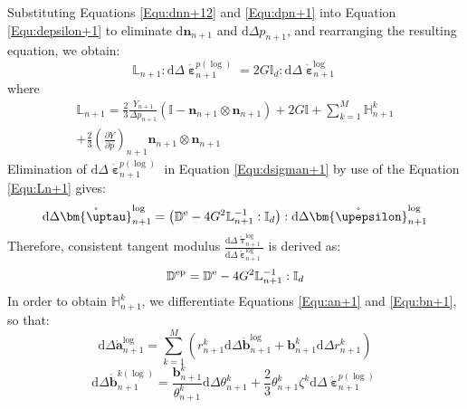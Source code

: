 Substituting Equations \ref{Equ:dnn+12} and \ref{Equ:dpn+1} into Equation \ref{Equ:depsilon+1} to eliminate ${\text{d}}{{\mathbf{n}}_{n + 1}}$ and ${\text{d}}\Delta {p_{n + 1}}$, and rearranging the resulting equation, we obtain:
\begin{equation}
{\mathbb{L}_{n + 1}}:{\text{d}}\Delta \mathring {\bm{\upepsilon}}_{n + 1}^{p(\log) } = 2G{\mathbb{I}_d}:{\text{d}}\Delta \mathring {\bm{\upepsilon}}_{n + 1}^{\log }
\end{equation}
where
\begin{equation}
\label{Equ:Ln+1}
\begin{aligned}
\mathbb{L}_{n + 1} = \frac{2}{3}\frac{Y_{n + 1}}{\Delta {p_{n + 1}}} \left( \mathbb{I} - \mathbf{n}_{n + 1} \otimes \mathbf{n}_{n + 1} \right) + 2G\mathbb{I} + \sum \limits_{k = 1}^M {\mathbb{H}_{n + 1}^k} \\
   + \frac{2}{3}{{\left( {\frac{{\partial Y}}{{\partial p}}} \right)}_{n + 1}}{{\mathbf{n}}_{n + 1}} \otimes {{\mathbf{n}}_{n + 1}}
\end{aligned}
\end{equation}
Elimination of ${\text{d}}\Delta \mathring {\bm{\upepsilon}}_{n + 1}^{p(\log) }$ in Equation \ref{Equ:dsigman+1} by use of the Equation \ref{Equ:Ln+1} gives:
\begin{equation}
{\text{d}}\Delta \mathring {\bm{\uptau}}_{n + 1}^{\log } = \left( {{\mathbb{D}^{\rm{e}}} - 4{G^2}\mathbb{L}_{n + 1}^{ - 1}:{\mathbb{I}_d}} \right):{\text{d}}\Delta \mathring {\bm{\upepsilon}}_{n + 1}^{\log }
\end{equation}
Therefore, consistent tangent modulus $\frac{{\text{d}}\Delta \mathring {\bm{\uptau}}_{n + 1}^{\log }}{{\text{d}}\Delta \mathring {\bm{\upepsilon}}_{n + 1}^{\log }}$ is derived as:
\begin{equation}
{\mathbb{D}^{\rm{ep}}} = {\mathbb{D}^{\rm{e}}} - 4{G^2}\mathbb{L}_{n + 1}^{ - 1}:{\mathbb{I}_d}
\end{equation}
In order to obtain $\mathbb{H}_{n + 1}^k$, we differentiate Equations \ref{Equ:an+1} and \ref{Equ:bn+1}, so that:
\begin{equation}
\text{d} \Delta \mathring {\mathbf{a}}_{n + 1}^{\log } = \sum\limits_{k = 1}^M {\left( {r_{n + 1}^k\text{d} \Delta \mathring {\mathbf{b}}_{n + 1}^{\log } + {\mathbf{b}}_{n + 1}^k{\text{d}} \Delta r_{n + 1}^k} \right)}
\end{equation}
\begin{equation}
\label{Equ:dbn+1}
\text{d} \Delta \mathring {\mathbf{b}}_{n + 1}^{k(\log) } = \frac{{{\mathbf{b}}_{n + 1}^k}}{{\theta _{n + 1}^k}}{\text{d}} \Delta \theta _{n + 1}^k + \frac{2}{3}\theta _{n + 1}^k{\zeta ^k}{\text{d}}\Delta \mathring {\bm{\upepsilon}}_{n + 1}^{p(\log) }
\end{equation}
